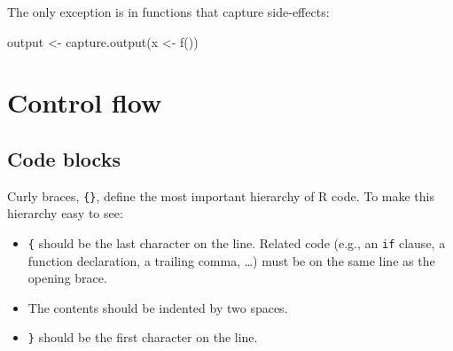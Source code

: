 \documentclass[twoside, pagesize, fontsize=11pt, dvipsnames]{scrreport} %
\newenvironment{Shaded}{\begin{snugshade}}{\end{snugshade}}
\newcommand{\FunctionTok}[1]{\textcolor[rgb]{0.28,0.35,0.67}{#1}}
\newcommand{\NormalTok}[1]{\textcolor[rgb]{0.00,0.23,0.31}{#1}}
\newcommand{\OtherTok}[1]{\textcolor[rgb]{0.00,0.23,0.31}{#1}}
\begin{document}
The only exception is in functions that capture side-effects:

\begin{Shaded}
\begin{Highlighting}[]
\NormalTok{output }\OtherTok{\textless{}{-}} \FunctionTok{capture.output}\NormalTok{(x }\OtherTok{\textless{}{-}} \FunctionTok{f}\NormalTok{())}
\end{Highlighting}
\end{Shaded}

\hypertarget{control-flow}{%
\section{Control flow}\label{control-flow}}

\hypertarget{indenting}{%
\subsection{Code blocks}\label{indenting}}

Curly braces, \texttt{\{\}}, define the most important hierarchy of R
code. To make this hierarchy easy to see:

\begin{itemize}
\item
  \texttt{\{} should be the last character on the line. Related code
  (e.g., an \texttt{if} clause, a function declaration, a trailing
  comma, \ldots) must be on the same line as the opening brace.
\item
  The contents should be indented by two spaces.
\item
  \texttt{\}} should be the first character on the line.
\end{itemize}
\end{document}
